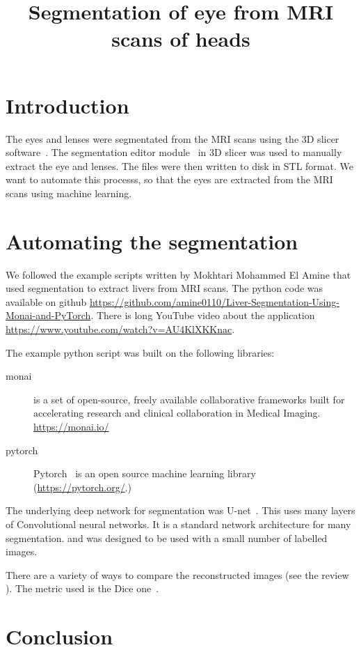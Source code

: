 \documentclass[12pt]{article}
\begin{document}
\title{Segmentation of eye from MRI scans of heads}
\date{}

\maketitle


\section{Introduction}

The eyes and lenses were segmentated from the MRI scans
using the 3D slicer software~\cite{kikinis20133d}.
The segmentation editor module~\cite{pinter2019polymorph}
in 3D slicer was used to manually
extract the eye and lenses.
The
files were then written to disk in STL format.
We want to automate this processs, so that the eyes are extracted from
the MRI scans using machine learning.


\section{Automating the segmentation}

We followed the example scripts written by
Mokhtari Mohammed El Amine that used segmentation to extract
livers from MRI scans. The python code was available
on github
\url{https://github.com/amine0110/Liver-Segmentation-Using-Monai-and-PyTorch}. There
is long YouTube video about the application
\url{https://www.youtube.com/watch?v=AU4KlXKKnac}.

The example python script was built on the following libraries:

\begin{description}

  \item[monai] is a set of open-source, freely available collaborative frameworks built for accelerating research and clinical collaboration in Medical Imaging.  \url{https://monai.io/}

\item[pytorch] Pytorch~\cite{paszke2019pytorch}
  is an open source machine learning library  (\url{https://pytorch.org/}.)
    
\end{description}

The underlying deep network for segmentation was
U-net~\cite{ronneberger2015u}. 
This uses many layers of Convolutional neural networks.
It is a standard network architecture for many segmentation.
and was designed to be used with a small number of labelled images.

There are a variety of ways to compare the reconstructed
images (see the review~\cite{taha2015metrics} ).
The metric used is the Dice one~\cite{zijdenbos1994morphometric}.

\section{Conclusion}



\end{document}
